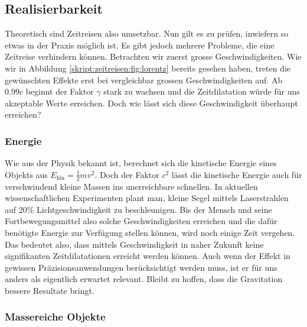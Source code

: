 \begin{refsection}
	\section{Realisierbarkeit}
    
    Theoretisch sind Zeitreisen also umsetzbar. Nun gilt es zu prüfen, inwiefern so etwas in der Praxis möglich ist. Es gibt jedoch mehrere Probleme, die eine Zeitreise verhindern können.
    Betrachten wir zuerst grosse Geschwindigkeiten. Wie wir in Abbildung \ref{skript:zeitreisen:fig:lorentz} bereits gesehen haben, treten die gewünschten Effekte erst bei vergleichbar grossen Geschwindigkeiten auf. Ab $0.99c$ beginnt der Faktor $\gamma$ stark zu wachsen und die Zeitdilatation würde für uns akzeptable Werte erreichen.
    Doch wie lässt sich diese Geschwindigkeit überhaupt erreichen?
    
    \subsubsection{Energie}\label{skript:chapters:zrirtreisen:energie}
    
    Wie aus der Physik bekannt ist, berechnet sich die kinetische Energie eines Objekts aus $E_{\text{kin}}=\frac{1}{2}mv^2$. Doch der Faktor $c^2$ lässt die kinetische Energie auch für verschwindend kleine Massen ins unerreichbare schnellen.
    In aktuellen wissenschaftlichen Experimenten plant man, kleine Segel mittels Laserstrahlen auf 20\% Lichtgeschwindigkeit zu beschleunigen. Bis der Mensch und seine Fortbewegungsmittel also solche Geschwindigkeiten erreichen und die dafür benötigte Energie zur Verfügung stellen können, wird noch einige Zeit vergehen.
    Das bedeutet also, dass mittels Geschwindigkeit in naher Zukunft keine signifikanten Zeitdilatationen erreicht werden können. Auch wenn der Effekt in gewissen Präzisionsanwendungen berücksichtigt werden muss, ist er für uns anders als eigentlich erwartet relevant. Bleibt zu hoffen, dass die Gravitation bessere Resultate bringt. 
    
    \subsubsection{Massereiche Objekte}
    

\end{refsection}
